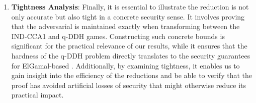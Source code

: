 \begin{enumerate}
\item \textbf{Tightness Analysis}: Finally, it is essential to illustrate the reduction is not only accurate but also tight in a concrete security sense. It involves proving that the adversarial is maintained exactly when transforming between the IND-CCA1 and q-DDH games. Constructing such concrete bounds is significant for the practical relevance of our results, while it ensures that the hardness of the q-DDH problem directly translates to the security guarantees for ElGamal-based \KEM. Additionally, by examining tightness, it enables us to gain insight into the efficiency of the reductions and be able to verify that the proof has avoided artificial losses of security that might otherwise reduce its practical impact.
\end{enumerate}





